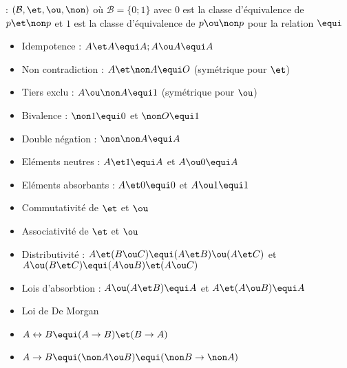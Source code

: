  : $(\mathcal{B},\et,\ou,\non)$ où $\mathcal{B} = \{0;1\}$ avec $0$ est la classe d'équivalence de $p\et\non p$ et $1$ est la classe d'équivalence de $p\ou\non p$ pour la relation $\equi$\\

\begin{itemize}
  \item Idempotence : $A\et A \equi A; A\ou A \equi A$
  \item Non contradiction : $A\et \non A \equi O$ (symétrique pour $\et$)
  \item Tiers exclu : $A \ou \non A \equi 1$ (symétrique pour $\ou$)
  \item Bivalence : $\non 1 \equi 0$ et $\non O \equi 1$
  \item Double négation : $\non \non A \equi A$
  \item Eléments neutres : $A\et 1 \equi A$ et $A \ou 0 \equi A$
  \item Eléments absorbants : $A \et 0 \equi 0$ et $A \ou 1 \equi 1$
  \item Commutativité de $\et$ et $\ou$
  \item Associativité de $\et$ et $\ou$
  \item Distributivité : $A\et(B\ou C) \equi (A \et B)\ou(A\et C)$ et $A\ou(B\et C) \equi (A\ou B) \et (A \ou C)$
  \item Lois d'absorbtion : $A \ou (A\et B) \equi A$ et $A\et (A\ou B) \equi A$
\end{itemize}

\begin{itemize}
  \item Loi de De Morgan
  \item $A \leftrightarrow B \equi (A \rightarrow B) \et (B \rightarrow A)$
  \item $A \rightarrow B \equi (\non A \ou B) \equi (\non B \rightarrow \non A)$
\end{itemize}
